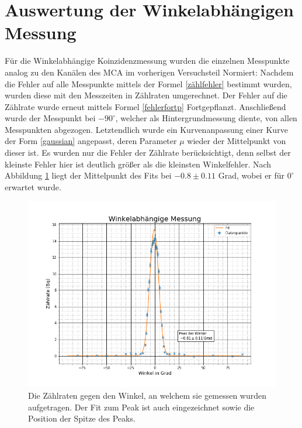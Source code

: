 \section{Auswertung der Winkelabhängigen Messung}
Für die Winkelabhängige Koinzidenzmessung wurden die einzelnen Messpunkte analog zu den Kanälen des MCA im vorherigen Versuchsteil Normiert:
Nachdem die Fehler auf alle Messpunkte mittels der Formel \ref{zählfehler} bestimmt wurden, wurden diese mit den Messzeiten in Zählraten umgerechnet. Der Fehler auf die Zählrate wurde erneut mittels Formel \ref{fehlerfortp} Fortgepflanzt. Anschließend wurde der Messpunkt bei $-90^\circ$, welcher als Hintergrundmessung diente, von allen Messpunkten abgezogen.
Letztendlich wurde ein Kurvenanpassung einer Kurve der Form \ref{gaussian} angepasst, deren Parameter $\mu$ wieder der Mittelpunkt von dieser ist. Es wurden nur die Fehler der Zählrate berücksichtigt, denn selbst der kleinste Fehler hier ist deutlich größer als die kleinsten Winkelfehler. Nach Abbildung \ref{Winkelbild} liegt der Mittelpunkt des Fits bei $-0.8\pm0.11$ Grad, wobei er für $0^\circ$ erwartet wurde. 

\begin{figure}[h]
	\centering
	\includegraphics[scale=0.7]{Bilder/Winkel}
	\caption[Winkelmessung]{\small Die Zählraten gegen den Winkel, an welchem sie gemessen wurden aufgetragen. Der Fit zum Peak ist auch eingezeichnet sowie die Position der Spitze des Peaks.}
	\label{Winkelbild}
\end{figure}

